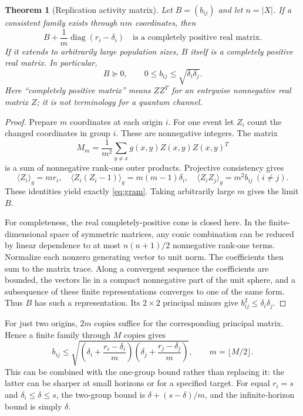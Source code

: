 \documentclass[11pt,a4paper]{article}
\newtheorem{theorem}{Theorem}
\newcommand{\diag}{\operatorname{diag}}
\begin{document}
\begin{theorem}[Replication activity matrix]
Let $B=(b_{ij})$ and let $n=|X|$. If a consistent family exists through
$nm$ coordinates, then
\begin{equation}\label{eq:gram}
 B+\frac1m\diag(r_i-\delta_i)
 \quad\text{is a completely positive real matrix}.
\end{equation}
If it extends to arbitrarily large population sizes, $B$ itself is a
completely positive real matrix. In particular,
\[
 B\succeq0,\qquad 0\le b_{ij}\le\sqrt{\delta_i\delta_j}.
\]
Here ``completely positive matrix'' means $ZZ^T$ for an entrywise
nonnegative real matrix $Z$; it is not terminology for a quantum channel.
\end{theorem}
\begin{proof}
Prepare $m$ coordinates at each origin $i$. For one event let $Z_i$ count
the changed coordinates in group $i$. These are nonnegative integers.
The matrix
\[
 M_m=\frac1{m^2}\sum_{y\ne x}g(x,y)Z(x,y)Z(x,y)^T
\]
is a sum of nonnegative rank-one outer products. Projective consistency
gives
\[
 \langle Z_i\rangle_g=mr_i,\quad
 \langle Z_i(Z_i-1)\rangle_g=m(m-1)\delta_i,\quad
 \langle Z_iZ_j\rangle_g=m^2b_{ij}\ (i\ne j).
\]
These identities yield exactly \eqref{eq:gram}. Taking arbitrarily large
$m$ gives the limit $B$.

For completeness, the real completely-positive cone is closed here.
In the finite-dimensional space of symmetric matrices, any conic
combination can be reduced by linear dependence to at most $n(n+1)/2$
nonnegative rank-one terms. Normalize each nonzero generating vector to
unit norm. The coefficients then sum to the matrix trace. Along a convergent
sequence the coefficients are bounded, the vectors lie in a compact
nonnegative part of the unit sphere, and a subsequence of these finite
representations converges to one of the same form. Thus $B$ has such a
representation. Its $2\times2$ principal minors give
$b_{ij}^2\le\delta_i\delta_j$.
\end{proof}

For just two origins, $2m$ copies suffice for the corresponding principal
matrix. Hence a finite family through $M$ copies gives
\[
 b_{ij}\le
 \sqrt{\left(\delta_i+\frac{r_i-\delta_i}{m}\right)
             \left(\delta_j+\frac{r_j-\delta_j}{m}\right)},
 \qquad m=\lfloor M/2\rfloor.
\]
This can be combined with the one-group bound rather than replacing it:
the latter can be sharper at small horizons or for a specified target.
For equal $r_i=s$ and $\delta_i\le\delta\le s$, the two-group bound is
$\delta+(s-\delta)/m$, and the infinite-horizon bound is simply $\delta$.
\end{document}

